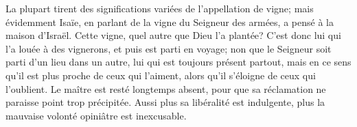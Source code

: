 La plupart tirent des significations variées de l’appellation de vigne;
	mais évidemment Isaïe, en parlant de la vigne du Seigneur des armées,
	a pensé à la maison d’Israël.
Cette vigne, quel autre que Dieu l’a plantée?
C’est donc lui qui l’a louée à des vignerons, et puis est parti en voyage;
	non que le Seigneur soit parti d’un lieu dans un autre,
	lui qui est toujours présent partout,
	mais en ce sens qu’il est plus proche de ceux qui l’aiment,
	alors qu’il s’éloigne de ceux qui l’oublient.
Le maître est resté longtemps absent,
	pour que sa réclamation ne paraisse point trop précipitée.
Aussi plus sa libéralité est indulgente,
	plus la mauvaise volonté opiniâtre est inexcusable.

